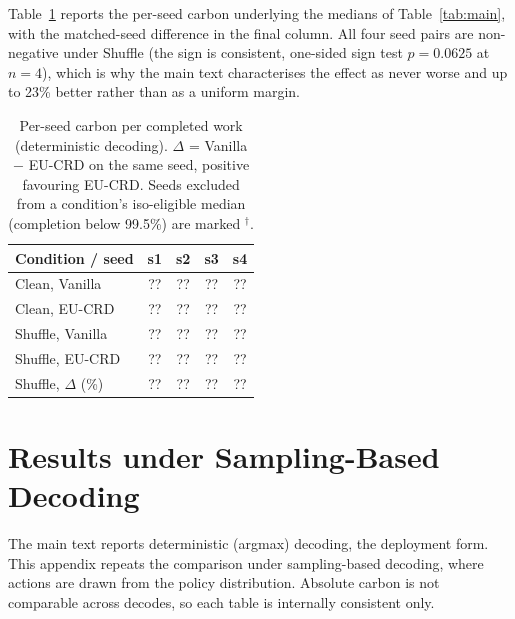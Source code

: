 Table~\ref{tab:perseed} reports the per-seed carbon underlying the medians of Table~\ref{tab:main}, with the matched-seed difference in the final column. All four seed pairs are non-negative under Shuffle (the sign is consistent, one-sided sign test $p{=}0.0625$ at $n{=}4$), which is why the main text characterises the effect as never worse and up to 23\% better rather than as a uniform margin.

\begin{table}[ht]
\caption{Per-seed carbon per completed work (deterministic decoding). $\Delta$ = Vanilla $-$ EU-CRD on the same seed, positive favouring EU-CRD. Seeds excluded from a condition's iso-eligible median (completion below 99.5\%) are marked $^{\dagger}$.}
\label{tab:perseed}
\centering
\small
\begin{tabular*}{\linewidth}{@{\extracolsep{\fill}}lcccc@{}}
\toprule
Condition / seed & s1 & s2 & s3 & s4 \\
\midrule
Clean, Vanilla   & ?? & ?? & ?? & ?? \\
Clean, EU-CRD    & ?? & ?? & ?? & ?? \\
Shuffle, Vanilla & ?? & ?? & ?? & ?? \\
Shuffle, EU-CRD  & ?? & ?? & ?? & ?? \\
Shuffle, $\Delta$ (\%) & ?? & ?? & ?? & ?? \\
\bottomrule
\end{tabular*}
\end{table}

\section{Results under Sampling-Based Decoding}
\label{app:stoch}

The main text reports deterministic (argmax) decoding, the deployment form. This appendix repeats the comparison under sampling-based decoding, where actions are drawn from the policy distribution. Absolute carbon is not comparable across decodes, so each table is internally consistent only.

